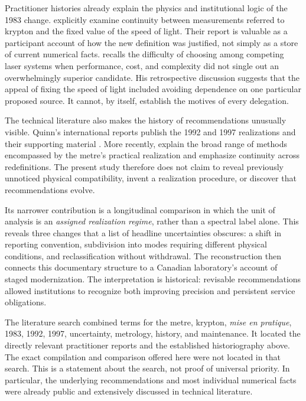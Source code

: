 \documentclass[11pt,a4paper]{article}
\begin{document}
Practitioner histories already explain the physics and institutional logic of the 1983 change. \citet{jennings1987} explicitly examine continuity between measurements referred to krypton and the fixed value of the speed of light. Their report is valuable as a participant account of how the new definition was justified, not simply as a store of current numerical facts. \citet{hall2006} recalls the difficulty of choosing among competing laser systems when performance, cost, and complexity did not single out an overwhelmingly superior candidate. His retrospective discussion suggests that the appeal of fixing the speed of light included avoiding dependence on one particular proposed source. It cannot, by itself, establish the motives of every delegation.

The technical literature also makes the history of recommendations unusually visible. Quinn's international reports publish the 1992 and 1997 realizations and their supporting material \citep{quinn1994,quinn1999}. More recently, \citet{schodel2021} explain the broad range of methods encompassed by the metre's practical realization and emphasize continuity across redefinitions. The present study therefore does not claim to reveal previously unnoticed physical compatibility, invent a realization procedure, or discover that recommendations evolve.

Its narrower contribution is a longitudinal comparison in which the unit of analysis is an \emph{assigned realization regime}, rather than a spectral label alone. This reveals three changes that a list of headline uncertainties obscures: a shift in reporting convention, subdivision into modes requiring different physical conditions, and reclassification without withdrawal. The reconstruction then connects this documentary structure to a Canadian laboratory's account of staged modernization. The interpretation is historical: revisable recommendations allowed institutions to recognize both improving precision and persistent service obligations.

The literature search combined terms for the metre, krypton, \emph{mise en pratique}, 1983, 1992, 1997, uncertainty, metrology, history, and maintenance. It located the directly relevant practitioner reports and the established historiography above. The exact compilation and comparison offered here were not located in that search. This is a statement about the search, not proof of universal priority. In particular, the underlying recommendations and most individual numerical facts were already public and extensively discussed in technical literature.
\end{document}
